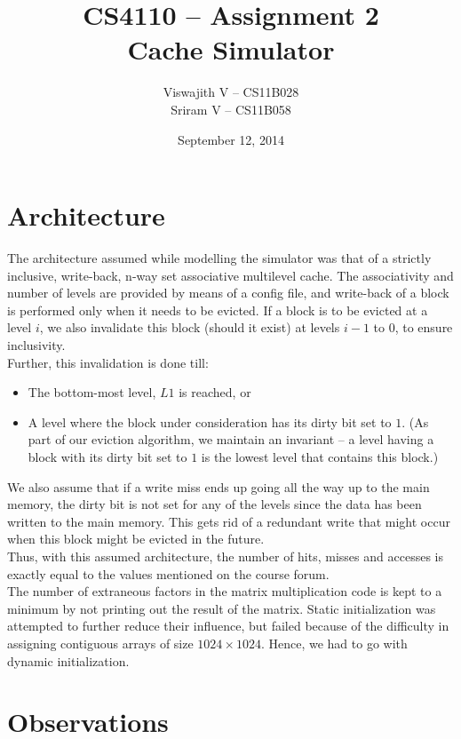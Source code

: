 \documentclass{article}
\title{\textbf{CS4110 -- Assignment 2\\Cache Simulator}}
\author{Viswajith V -- CS11B028\\Sriram V -- CS11B058}
\date{September 12, 2014}
\begin{document}
\maketitle

\section{Architecture}
The architecture assumed while modelling the simulator was that of a strictly inclusive, write-back, n-way set associative multilevel cache. The associativity and number of levels are provided by means of a config file, and write-back of a block is performed only when it needs to be evicted. If a block is to be evicted at a level $i$, we also invalidate this block (should it exist) at levels $i-1$ to $0$, to ensure inclusivity.\\
Further, this invalidation is done till:
\begin{itemize}
    \item
        The bottom-most level, $L1$ is reached, or
    \item
        A level where the block under consideration has its dirty bit set to $1$. (As part of our eviction algorithm, we maintain an invariant -- a level having a block with its dirty bit set to $1$ is the lowest level that contains this block.)
\end{itemize}
We also assume that if a write miss ends up going all the way up to the main memory, the dirty bit is not set for any of the levels since the data has been written to the main memory. This gets rid of a redundant write that might occur when this block might be evicted in the future.\\
Thus, with this assumed architecture, the number of hits, misses and accesses is exactly equal to the values mentioned on the course forum.\\
The number of extraneous factors in the matrix multiplication code is kept to a minimum by not printing out the result of the matrix. Static initialization was attempted to further reduce their influence, but failed because of the difficulty in assigning contiguous arrays of size $1024 \times 1024$. Hence, we had to go with dynamic initialization.

\section{Observations}
\end{document}
